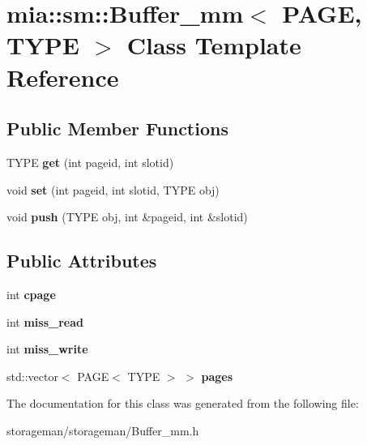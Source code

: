 \hypertarget{classmia_1_1sm_1_1_buffer__mm}{\section{mia\-:\-:sm\-:\-:Buffer\-\_\-mm$<$ P\-A\-G\-E, T\-Y\-P\-E $>$ Class Template Reference}
\label{classmia_1_1sm_1_1_buffer__mm}
}
\subsection*{Public Member Functions}
\begin{DoxyCompactItemize}
\item 
\hypertarget{classmia_1_1sm_1_1_buffer__mm_a1679c5089078fc73b6aa33b1817cf0ca}{T\-Y\-P\-E {\bfseries get} (int pageid, int slotid)}\label{classmia_1_1sm_1_1_buffer__mm_a1679c5089078fc73b6aa33b1817cf0ca}

\item 
\hypertarget{classmia_1_1sm_1_1_buffer__mm_a23322e755d5d8f61b60fbb97243658ff}{void {\bfseries set} (int pageid, int slotid, T\-Y\-P\-E obj)}\label{classmia_1_1sm_1_1_buffer__mm_a23322e755d5d8f61b60fbb97243658ff}

\item 
\hypertarget{classmia_1_1sm_1_1_buffer__mm_ad4cb43214f27c955b9a9be4903adf951}{void {\bfseries push} (T\-Y\-P\-E obj, int \&pageid, int \&slotid)}\label{classmia_1_1sm_1_1_buffer__mm_ad4cb43214f27c955b9a9be4903adf951}

\end{DoxyCompactItemize}
\subsection*{Public Attributes}
\begin{DoxyCompactItemize}
\item 
\hypertarget{classmia_1_1sm_1_1_buffer__mm_a2cdd9bd381e34e5a27b546133ea0c089}{int {\bfseries cpage}}\label{classmia_1_1sm_1_1_buffer__mm_a2cdd9bd381e34e5a27b546133ea0c089}

\item 
\hypertarget{classmia_1_1sm_1_1_buffer__mm_ac4c2a6a85efca2365dc11d99beb731ff}{int {\bfseries miss\-\_\-read}}\label{classmia_1_1sm_1_1_buffer__mm_ac4c2a6a85efca2365dc11d99beb731ff}

\item 
\hypertarget{classmia_1_1sm_1_1_buffer__mm_a7a095f928a1c8fc6760b793ae40888f3}{int {\bfseries miss\-\_\-write}}\label{classmia_1_1sm_1_1_buffer__mm_a7a095f928a1c8fc6760b793ae40888f3}

\item 
\hypertarget{classmia_1_1sm_1_1_buffer__mm_ab2dac9275c5cea293d4e62e6cb6f5b75}{std\-::vector$<$ P\-A\-G\-E$<$ T\-Y\-P\-E $>$ $>$ {\bfseries pages}}\label{classmia_1_1sm_1_1_buffer__mm_ab2dac9275c5cea293d4e62e6cb6f5b75}

\end{DoxyCompactItemize}


The documentation for this class was generated from the following file\-:\begin{DoxyCompactItemize}
\item 
storageman/storageman/Buffer\-\_\-mm.\-h\end{DoxyCompactItemize}
